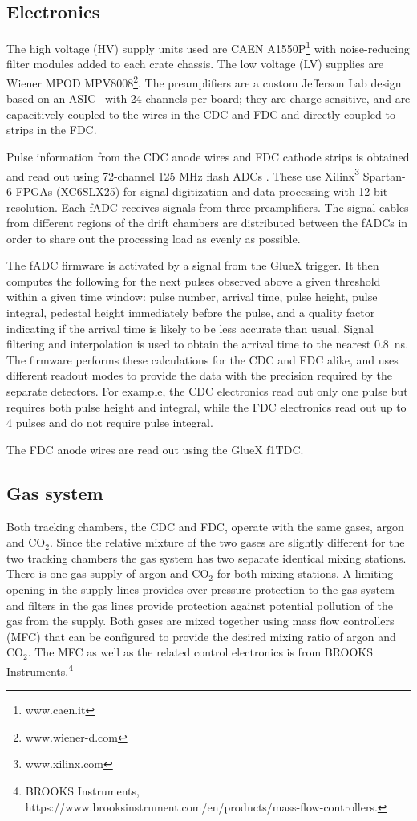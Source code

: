 \subsection{Electronics \label{sec:dcelectronics}}
The high voltage (HV) supply units used are CAEN A1550P\footnote{www.caen.it} with noise-reducing filter modules added to each crate chassis. 
The low voltage (LV) supplies are Wiener MPOD MPV8008\footnote{www.wiener-d.com}. 
The preamplifiers are a custom Jefferson Lab design based on an ASIC~\cite{hdnote2515}
with 24 channels per board; they are charge-sensitive, and are capacitively coupled to the wires in the CDC and FDC and directly coupled to strips in the FDC. 

Pulse information from the CDC anode wires and FDC cathode strips is obtained and read out using 72-channel 125 MHz flash ADCs \cite{Visser2008,5873864}. These use Xilinx\footnote{www.xilinx.com} Spartan-6 FPGAs (XC6SLX25) for signal digitization and data processing with 12 bit resolution.
Each fADC receives signals from three preamplifiers. 
The signal cables from different regions of the drift chambers are distributed between the fADCs in order to share out the processing load as evenly as possible.  

The fADC firmware is activated by a signal from the GlueX trigger. It then computes the following for the next pulses observed above a given threshold within a given time window: pulse number, arrival time, pulse height, pulse integral, pedestal height immediately before the pulse, and a quality factor indicating if the arrival time is likely to be less accurate than usual. 
Signal filtering and interpolation is used to obtain the arrival time to the nearest 0.8~ns. 
The firmware performs these calculations for the CDC and FDC alike, and uses different readout modes to provide the data with the precision required by the separate detectors. 
For example, the CDC electronics read out only one pulse but requires both pulse height and integral, while the FDC electronics read out up to 4 pulses and do not require pulse integral.  

The FDC anode wires are read out using the GlueX f1TDC\cite{hdnote1021}. 

\subsection[Gas system]{Gas system \label{sec:gas}}
Both tracking chambers, the CDC and FDC, operate with the same gases, argon and CO$_{2}$. Since the relative mixture of
the two gases are slightly different for the two tracking chambers the gas system has two separate identical mixing stations. There is one gas supply of argon and CO$_{2}$ for both mixing stations. A limiting opening in the supply
lines provides over-pressure protection to the gas system and filters in the gas lines provide protection against potential
pollution of the gas from the supply. Both gases are mixed together using mass flow controllers (MFC) that can be 
configured
to provide the desired mixing ratio of argon and CO$_{2}$.  The MFC as well as the related control electronics is from
BROOKS Instruments.\footnote{BROOKS Instruments, https://www.brooksinstrument.com/en/products/mass-flow-controllers.}

